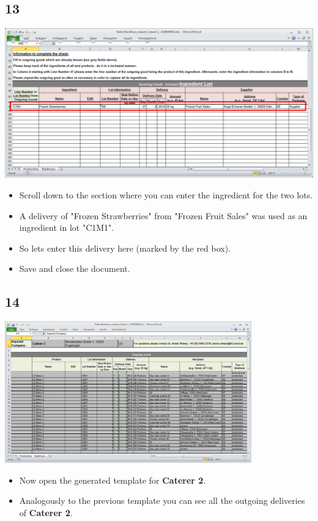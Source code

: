 \documentclass{beamer}
\begin{document}
\subsection{13}
\begin{frame}
	\begin{center}
  		\includegraphics[height=0.5\textwidth]{13.png}
	\end{center}
	\begin{itemize}
		\item Scroll down to the section where you can enter the ingredient for the two lots.
		\item A delivery of "Frozen Strawberries" from "Frozen Fruit Sales" was used as an ingredient in lot "C1M1".
		\item So lets enter this delivery here (marked by the red box).
		\item Save and close the document.
	\end{itemize}
\end{frame}

\subsection{14}
\begin{frame}
	\begin{center}
  		\includegraphics[width=0.8\textwidth]{14.png}
	\end{center}
	\begin{itemize}
		\item Now open the generated template for \textbf{Caterer 2}.
		\item Analogously to the previous template you can see all the outgoing deliveries of \textbf{Caterer 2}.
	\end{itemize}
\end{frame}
\end{document}
